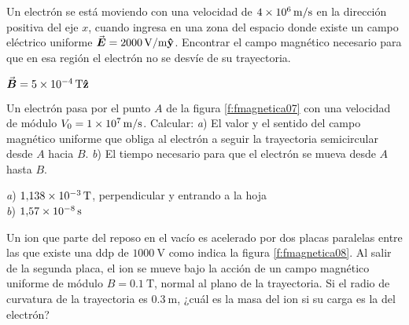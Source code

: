 %
\begin{minipage}[c]{0.5\textwidth}
\begin{center}
\end{center}
\end{minipage}
%
\begin{Exercise}
  Un electrón se está moviendo con una velocidad de $\SI{4E6}{\metre/\second}$ en la dirección positiva del eje $x$, cuando ingresa en una zona del espacio donde existe un campo eléctrico uniforme $\va*{E} = \SI{2000}{\volt/\metre}\vu{y}$. Encontrar el campo magnético necesario para que en esa región el electrón no se desvíe de su trayectoria.
\end{Exercise}
\begin{Answer}
  $\va*{B} = \SI{5E-4}{\tesla}\vu{z}$
\end{Answer}
%
\begin{Exercise}\label{p:fmagnetica07}
  Un electrón pasa por el punto $A$ de la figura \ref{f:fmagnetica07} con una velocidad de módulo $V_0 = \SI{1E7}{\metre/\second}$. Calcular: \textit{a}) El valor y el sentido del campo magnético uniforme que obliga al electrón a seguir la trayectoria semicircular desde $A$ hacia $B$. \textit{b}) El tiempo necesario para que el electrón se mueva desde $A$ hasta $B$.
\end{Exercise}
\begin{Answer}
  \begin{minipage}[t]{.4\textwidth}
    \textit{a}) $\SI{1.138E-3}{\tesla}$, perpendicular y entrando a la hoja\\ \textit{b}) $\SI{1.57E-8}{\second}$
  \end{minipage}
\end{Answer}
%
\begin{Exercise}\label{p:fmagnetica08}
  Un ion que parte del reposo en el vacío es acelerado por dos placas paralelas entre las que existe una ddp de $\SI{1000}{\volt}$ como indica la figura \ref{f:fmagnetica08}. Al salir de la segunda placa, el ion se mueve bajo la acción de un campo magnético uniforme de módulo $B = \SI{0.1}{\tesla}$, normal al plano de la trayectoria. Si el radio de curvatura de la trayectoria es $\SI{0.3}{\metre}$, ¿cuál es la masa del ion si su carga es la del electrón?
\end{Exercise}
